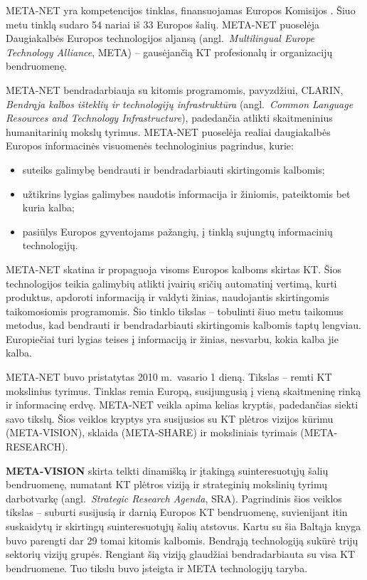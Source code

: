 \begin{multicols}{2}

META-NET yra kompetencijos tinklas, finansuojamas Europos Komisijos \cite{rehm2011}. Šiuo metu tinklą sudaro 54 nariai iš 33 Europos šalių. META-NET puoselėja Daugiakalbės Europos technologijos aljansą (angl.~\textit{Multilingual Europe Technology Alliance}, META) – gausėjančią KT profesionalų ir organizacijų bendruomenę.

META-NET bendradarbiauja su kitomis programomis, pavyzdžiui, CLARIN, \textit{Bendrąja kalbos išteklių ir technologijų infrastruktūra} (angl.~\textit{Common Language Resources and Technology Infrastructure}), padedančia atlikti skaitmeninius humanitarinių mokslų tyrimus. META-NET puoselėja realiai daugiakalbės Europos informacinės visuomenės technologinius pagrindus, kurie:

\begin{itemize}
\item suteiks galimybę bendrauti ir bendradarbiauti skirtingomis kalbomis;
\item užtikrins lygias galimybes naudotis informacija ir žiniomis, pateiktomis bet kuria kalba;
\item pasiūlys Europos gyventojams pažangių, į tinklą sujungtų informacinių technologijų.
\end{itemize}

META-NET skatina ir propaguoja visoms Europos kalboms skirtas KT. Šios technologijos teikia galimybių atlikti įvairių sričių automatinį vertimą, kurti produktus, apdoroti informaciją ir valdyti žinias, naudojantis skirtingomis taikomosiomis programomis. Šio tinklo tikslas – tobulinti šiuo metu taikomus metodus, kad bendrauti ir bendradarbiauti skirtingomis kalbomis taptų lengviau. Europiečiai turi lygias teises į informaciją ir žinias, nesvarbu, kokia kalba jie kalba.

META-NET buvo pristatytas 2010 m.~vasario 1 dieną. Tikslas – remti KT mokslinius tyrimus. Tinklas remia Europą, susijungusią į vieną skaitmeninę rinką ir informacinę erdvę. META-NET veikla apima kelias kryptis, padedančias siekti savo tikslų. Šios veiklos kryptys yra susijusios su KT plėtros vizijos kūrimu (META-VISION), sklaida (META-SHARE) ir moksliniais tyrimais (META-RESEARCH).   

\textbf{META-VISION}  skirta telkti dinamišką ir įtakingą suinteresuotųjų šalių bendruomenę, numatant KT plėtros viziją ir strateginių mokslinių tyrimų darbotvarkę (angl.~\textit{Strategic Research Agenda}, SRA). Pagrindinis šios veiklos tikslas – suburti susijusią ir darnią Europos KT bendruomenę, suvienijant itin suskaidytų ir skirtingų suinteresuotųjų šalių atstovus. Kartu su šia Baltąja knyga buvo parengti dar 29 tomai kitomis kalbomis. Bendrąją technologiją sukūrė trijų sektorių vizijų grupės. Rengiant šią viziją glaudžiai bendradarbiauta su visa KT bendruomene. Tuo tikslu buvo įsteigta ir META technologijų taryba.


\end{multicols}
